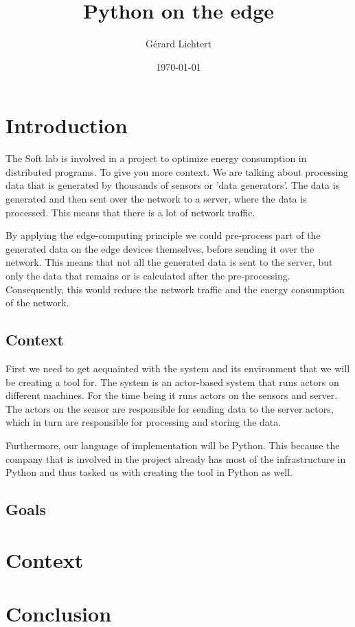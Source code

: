 \documentclass[a4paper]{article}
\title{Python on the edge}
\author{Gérard Lichtert}
\date{\today}
\begin{document}
\maketitle
\tableofcontents
\newpage
\raggedright{}


\section{Introduction}
The Soft lab is involved in a project to optimize energy consumption in distributed programs. To give you more context. We are talking about processing data that is generated by thousands of sensors or 'data generators'. The data is generated and then sent over the network to a server, where the data is processed. This means that there is a lot of network traffic.

By applying the edge-computing principle we could pre-process part of the generated data on the edge devices themselves, before sending it over the network. This means that not all the generated data is sent to the server, but only the data that remains or is calculated after the pre-processing. Consequently, this would reduce the network traffic and the energy consumption of the network.
\subsection{Context}
First we need to get acquainted with the system and its environment that we will be creating a tool for. The system is an actor-based system that runs actors on different machines. For the time being it runs actors on the sensors and server. The actors on the sensor are responsible for sending data to the server actors, which in turn are responsible for processing and storing the data.

Furthermore, our language of implementation will be Python. This because the company that is involved in the project already has most of the infrastructure in Python and thus tasked us with creating the tool in Python as well.

\subsection{Goals}
\section{Context}

\section{Conclusion}

\end{document}
